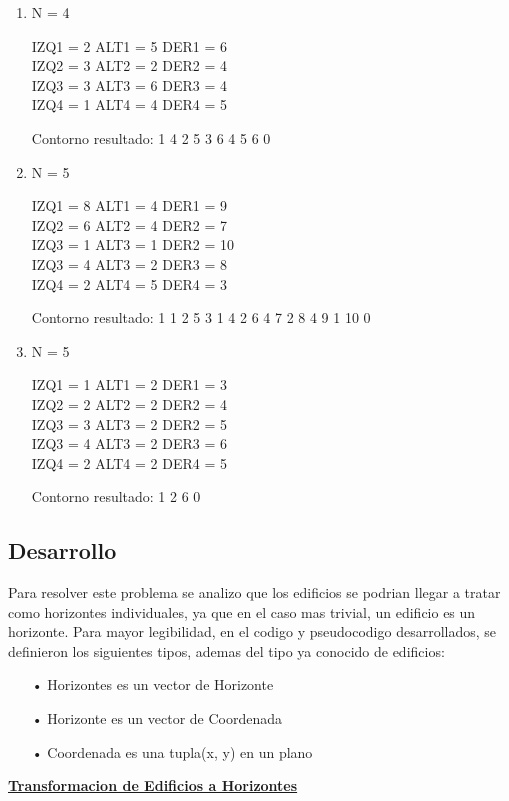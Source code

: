 \begin{enumerate}[leftmargin=0.5cm]
\item N = 4

IZQ1 = 2 ALT1 = 5 DER1 = 6\\
IZQ2 = 3 ALT2 = 2 DER2 = 4\\
IZQ3 = 3 ALT3 = 6 DER3 = 4\\
IZQ4 = 1 ALT4 = 4 DER4 = 5

Contorno resultado: 1 4 2 5 3 6 4 5 6 0

\item N = 5

IZQ1 = 8 ALT1 = 4 DER1 = 9\\
IZQ2 = 6 ALT2 = 4 DER2 = 7\\
IZQ3 = 1 ALT3 = 1 DER2 = 10\\
IZQ3 = 4 ALT3 = 2 DER3 = 8\\
IZQ4 = 2 ALT4 = 5 DER4 = 3

Contorno resultado: 1 1 2 5 3 1 4 2 6 4 7 2 8 4 9 1 10 0

\item N = 5

IZQ1 = 1 ALT1 = 2 DER1 = 3\\
IZQ2 = 2 ALT2 = 2 DER2 = 4\\
IZQ3 = 3 ALT3 = 2 DER2 = 5\\
IZQ3 = 4 ALT3 = 2 DER3 = 6\\
IZQ4 = 2 ALT4 = 2 DER4 = 5

Contorno resultado: 1 2 6 0
\end{enumerate}
\newpage
\subsection{Desarrollo}
Para resolver este problema se analizo que los edificios se podrian llegar a tratar como horizontes individuales, ya que en el caso mas trivial, un edificio es un horizonte. Para mayor legibilidad, en el codigo y pseudocodigo desarrollados, se definieron los siguientes tipos, ademas del tipo ya conocido de edificios:

\begin{itemize}
\item[•]Horizontes es un vector de Horizonte
\item[•]Horizonte es un vector de Coordenada
\item[•]Coordenada es una tupla(x, y) en un plano
\end{itemize}
\bigskip
\noindent \underline{\textbf{Transformacion de Edificios a Horizontes}}

